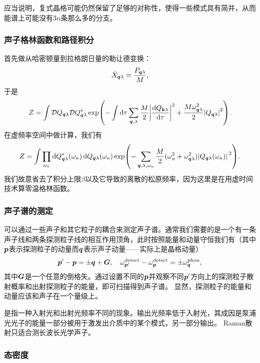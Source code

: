 应当说明，复式晶格可能仍然保留了足够的对称性，使得一些模式具有简并，从而能谱上可能没有$3n$条那么多的分支。

\subsubsection{声子格林函数和路径积分}

首先做从哈密顿量到拉格朗日量的勒让德变换：
\[
    \dot{X}_{\vb*{q} \lambda} = \frac{P_{\vb*{q} \lambda}}{M},
\]
于是
\begin{equation}
    Z = \int \mathcal{D} Q_{\vb*{q} \lambda} \mathcal{D} Q^*_{\vb*{q} \lambda} \exp(- \int \dd{\tau} \sum_{\vb*{q}, \lambda} \frac{M}{2} \abs{\dv{Q_{\vb*{k} \lambda}}{\tau}}^2 + \frac{M \omega_{\vb*{q} \lambda}^2}{2} \abs{Q_{\vb*{q} \lambda}}^2 ).
\end{equation}
在虚频率空间中做计算，我们有
\begin{equation}
    Z = \int \prod_{\omega_n} \dd{Q_{\vb*{q} \lambda}^*(\omega_n)} \dd{Q_{\vb*{q} \lambda}(\omega_n)} \exp(- \sum_{\vb*{q}, \lambda, \omega_n} \frac{M}{2} (\omega_n^2 + \omega_{\vb*{q} \lambda}^2) \abs*{Q_{\vb*{q} \lambda}(\omega_n)}^2).
\end{equation}
我们故意省去了积分上限$\beta$以及它导致的离散的松原频率，因为这里是在用虚时间技术算零温格林函数。

\subsubsection{声子谱的测定}

可以通过一些声子和其它粒子的耦合来测定声子谱。通常我们需要的是一个有一条声子线和两条探测粒子线的相互作用顶角，此时按照能量和动量守恒我们有（其中$\vb*{p}$表示探测粒子的动量而$\vb*{q}$表示声子动量——实际上是晶格动量）
\begin{equation}
    \vb*{p}' - \vb*{p} = \pm \vb*{q} + \vb*{G}, \quad \omega^\text{detect}_{\vb*{p}'} - \omega^\text{detect}_{\vb*{p}} = \pm \omega^\text{phon}_{\vb*{q}},
\end{equation}
其中$\vb*{G}$是一个任意的倒格矢。通过设置不同的$\vb*{p}$并观察不同$\vb*{p}'$方向上的探测粒子散射概率和出射探测粒子的能量，即可扫描得到声子谱。
显然，探测粒子的能量和动量应该和声子在一个量级上。

是指一种入射光和出射光频率不同的现象。输出光频率低于入射光，其成因是泵浦光光子的能量一部分被用于激发出介质中的某个模式，另一部分输出。
Raman散射只适合测长波长光学声子。

\subsubsection{态密度}

